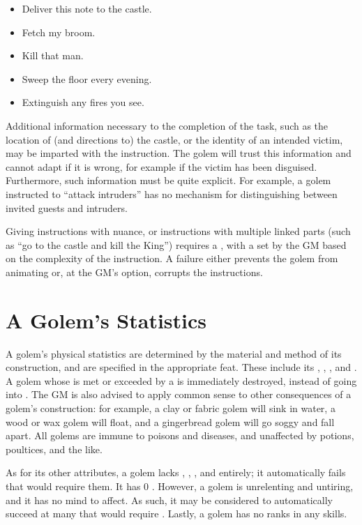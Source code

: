 \begin{itemize}
	\item Deliver this note to the castle.
	\item Fetch my broom.
	\item Kill that man.
	\item Sweep the floor every evening.
	\item Extinguish any fires you see.
\end{itemize}

Additional information necessary to the completion of the task, such as the location of (and directions to) the castle, or the identity of an intended victim, may be imparted with the instruction.
The golem will trust this information and cannot adapt if it is wrong, for example if the victim has been disguised.
Furthermore, such information must be quite explicit.
For example, a golem instructed to ``attack intruders'' has no mechanism for distinguishing between invited guests and intruders.

Giving instructions with nuance, or instructions with multiple linked parts (such as ``go to the castle and kill the King'') requires a {\test}, with a {\tn} set by the GM based on the complexity of the instruction.
A failure either prevents the golem from animating or, at the GM's option, corrupts the instructions.

\section{A Golem's Statistics}

A golem's physical statistics are determined by the material and method of its construction, and are specified in the appropriate feat.
These include its , , ,  and .
A golem whose  is met or exceeded by a {\damagetest} is immediately destroyed, instead of going into {\shock}.
The GM is also advised to apply common sense to other consequences of a golem's construction: for example, a clay or fabric golem will sink in water, a wood or wax golem will float, and a gingerbread golem will go soggy and fall apart.
All golems are immune to poisons and diseases, and unaffected by potions, poultices, and the like.

As for its other attributes, a golem lacks , , ,  and  entirely; it automatically fails {\tests} that would require them.
It has 0 .
However, a golem is unrelenting and untiring, and it has no mind to affect.
As such, it may be considered to automatically succeed at many {\tests} that would require .
Lastly, a golem has no ranks in any skills.

